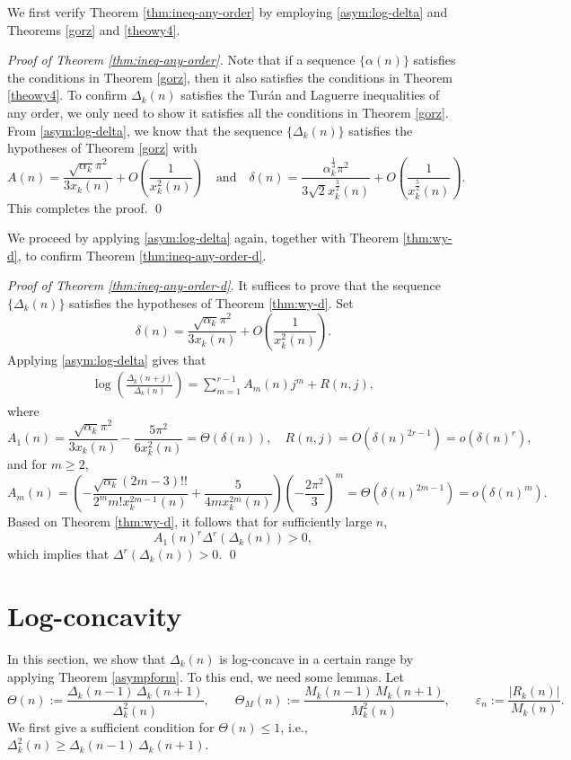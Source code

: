 \documentclass[12pt]{article}
\numberwithin{equation}{section}
\begin{document}
We first verify Theorem \ref{thm:ineq-any-order} by employing \eqref{asym:log-delta} and Theorems \ref{gorz} and \ref{theowy4}.

{\noindent\it{Proof of Theorem \ref{thm:ineq-any-order}.}}
Note that if a sequence $\{\alpha(n)\}$ satisfies the conditions in Theorem \ref{gorz}, then it also satisfies the conditions in Theorem \ref{theowy4}. To confirm $\Delta_k(n)$ satisfies the Tur\'an and Laguerre inequalities of any order, we only need to show it satisfies all the conditions in Theorem \ref{gorz}. From \eqref{asym:log-delta}, we know that the sequence $\{\Delta_k(n)\}$ satisfies the hypotheses of
Theorem \ref{gorz} with
\[A(n)=\frac{\sqrt{\alpha_k }\pi^2}{3x_{k}(n)}+O\left(\frac{1}{x_{k}^2(n)}\right)
\quad \text{and} \quad
\delta(n)=\frac{\alpha_k^{\frac 14} \pi^2}{3\sqrt{2}x_{k}^{\frac32}(n)}+O\left(\frac{1}{x_{k}^{\frac52}(n)}\right).\]
This completes the proof.
\qed

We proceed by applying \eqref{asym:log-delta} again, together with Theorem \ref{thm:wy-d}, to confirm Theorem \ref{thm:ineq-any-order-d}.

{\noindent\it{Proof of Theorem \ref{thm:ineq-any-order-d}.}}
It suffices to prove that the sequence $\{\Delta_k(n)\}$ satisfies the hypotheses of Theorem \ref{thm:wy-d}.
Set
\begin{equation*}
\delta(n)=\frac{\sqrt{\alpha_k }\pi^2}{3x_{k}(n)}+O\left(\frac{1}{x_{k}^2(n)}\right).
\end{equation*}
Applying \eqref{asym:log-delta} gives that
\begin{align*}
\log\left(\frac{\Delta_k(n+j)}{\Delta_k(n)}\right)
=\sum_{m=1}^{r-1}A_m(n)j^m+R(n,j),
\end{align*}
where
\[A_1(n)=\frac{\sqrt{\alpha_k }\pi^2}{3x_{k}(n)}-\frac{5\pi^2}{6x_{k}^2(n)}=\Theta(\delta(n)),
\quad
R(n,j)=O(\delta(n)^{2r-1})=o(\delta(n)^r),\]
and for $m\geq 2$,
\[
A_m(n)=\left(-\frac{\sqrt{\alpha_k }(2m-3)!!}{2^m m!x_{k}^{2m-1}(n)}+\frac{5}{4mx_{k}^{2m}(n)}\right)
\left(-\frac{2\pi^2}{3}\right)^m
=\Theta(\delta(n)^{2m-1})=o(\delta(n)^m).\]
Based on Theorem \ref{thm:wy-d}, it follows that for sufficiently large $n$,
\begin{equation*}
  A_1(n)^r\Delta^r\left(\Delta_k(n)\right)>0,
\end{equation*}
which implies that $\Delta^r\left(\Delta_k(n)\right)>0$.
\qed


\section{Log-concavity}\label{sec:log}
In this section, we show that $\Delta_k(n)$ is log-concave in a certain range by applying Theorem \ref{asympform}. To this end, we need some lemmas. Let
\[
\Theta(n):=\frac{\Delta_k(n-1)\,\Delta_k(n+1)}{\Delta_k^2(n)},
\qquad
\Theta_M(n):=\frac{M_k(n-1)\,M_k(n+1)}{M_k^2(n)},
\qquad
\varepsilon_n:=\frac{|R_k(n)|}{M_k(n)}.
\]
We first give a sufficient condition for $\Theta(n)\le 1$, i.e., $\Delta_k^2(n) \ge \Delta_k(n-1)\,\Delta_k(n+1)$.
\end{document}
